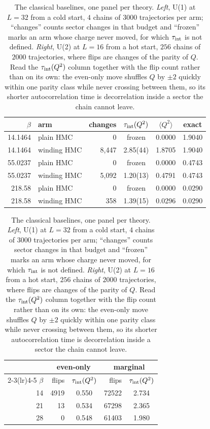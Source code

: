 \documentclass[prd, twocolumn, superscriptaddress, nofootinbib,floatfix]{revtex4-2}
\begin{document}
\begin{table}[htbp]
\centering
\small
\caption{The classical baselines, one panel per theory. \emph{Left}, U(1) at
$L=32$ from a cold start, $4$ chains of $3000$ trajectories per arm;
``changes'' counts sector changes in that budget and ``frozen'' marks an arm
whose charge never moved, for which $\tau_{\rm int}$ is not defined.
\emph{Right}, U(2) at $L=16$ from a hot start, $256$ chains of $2000$
trajectories, where flips are changes of the parity of $Q$. Read the $\tau_{\rm
int}(Q^2)$ column together with the flip count rather than on its own: the
even-only move shuffles $Q$ by $\pm2$ quickly within one parity class while
never crossing between them, so its shorter autocorrelation time is
decorrelation inside a sector the chain cannot leave.}
\label{tab:classical}
\begin{minipage}[t]{0.52\linewidth}
\centering
\begin{tabular}{r l r c c c}
\toprule
$\beta$ & arm & changes & $\tau_{\rm int}(Q^2)$ & $\langle Q^2\rangle$ & exact \\
\midrule
14.1464 & plain HMC   & 0       & frozen   & 0.0000 & 1.9040 \\
14.1464 & winding HMC & 8{,}447 & 2.85(44) & 1.8705 & 1.9040 \\
55.0237 & plain HMC   & 0       & frozen   & 0.0000 & 0.4743 \\
55.0237 & winding HMC & 5{,}092 & 1.20(13) & 0.4791 & 0.4743 \\
218.58  & plain HMC   & 0       & frozen   & 0.0000 & 0.0290 \\
218.58  & winding HMC & 358     & 1.39(15) & 0.0296 & 0.0290 \\
\bottomrule
\end{tabular}
\end{minipage}\hfill
\begin{minipage}[t]{0.44\linewidth}
\centering
\begin{tabular}{r rc rc}
\toprule
& \multicolumn{2}{c}{even-only} & \multicolumn{2}{c}{marginal} \\
\cmidrule(lr){2-3}\cmidrule(lr){4-5}
$\beta$ & flips & $\tau_{\rm int}(Q^2)$ & flips & $\tau_{\rm int}(Q^2)$ \\
\midrule
14 & 4919 & 0.550 & 72522 & 2.734 \\
21 & 13   & 0.534 & 67298 & 2.365 \\
28 & 0    & 0.548 & 61403 & 1.980 \\
\bottomrule
\end{tabular}
\end{minipage}
\end{table}
\end{document}
